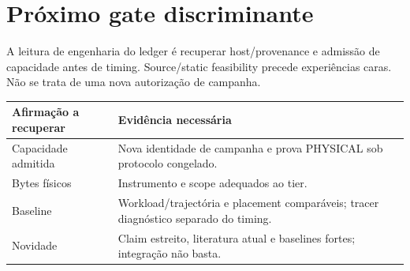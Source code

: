 \section{Próximo gate discriminante}
A leitura de engenharia do ledger é recuperar host/provenance e admissão de capacidade antes de timing. Source/static feasibility precede experiências caras. Não se trata de uma nova autorização de campanha. 

\begin{tabularx}{\linewidth}{@{}p{37mm}Y@{}}
\toprule \textbf{Afirmação a recuperar} & \textbf{Evidência necessária}\\ \midrule
Capacidade admitida & Nova identidade de campanha e prova PHYSICAL sob protocolo congelado.\\
Bytes físicos & Instrumento e scope adequados ao tier.\\
Baseline & Workload/trajectória e placement comparáveis; tracer diagnóstico separado do timing.\\
Novidade & Claim estreito, literatura atual e baselines fortes; integração não basta.\\
\bottomrule
\end{tabularx}
